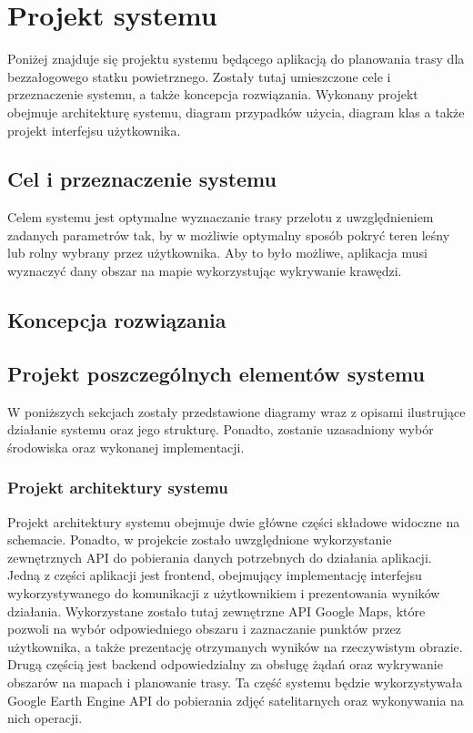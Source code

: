 \chapter{Projekt systemu}
\label{chap:system project}

Poniżej znajduje się projektu systemu będącego aplikacją do planowania trasy dla bezzałogowego statku powietrznego. Zostały tutaj umieszczone cele i przeznaczenie systemu, a także koncepcja rozwiązania. Wykonany projekt obejmuje architekturę systemu, diagram przypadków użycia, diagram klas a także projekt interfejsu użytkownika. 

\section{Cel i przeznaczenie systemu}

Celem systemu jest optymalne wyznaczanie trasy przelotu z uwzględnieniem zadanych parametrów tak, by w możliwie optymalny sposób pokryć teren leśny lub rolny wybrany przez użytkownika. Aby to było możliwe, aplikacja musi wyznaczyć dany obszar na mapie wykorzystując wykrywanie krawędzi.

\section{Koncepcja rozwiązania}



\section{Projekt poszczególnych elementów systemu}

W poniższych sekcjach zostały przedstawione diagramy wraz z opisami ilustrujące działanie systemu oraz jego strukturę. Ponadto, zostanie uzasadniony wybór środowiska oraz wykonanej implementacji.

\subsection{Projekt architektury systemu}

Projekt architektury systemu obejmuje dwie główne części składowe widoczne na schemacie. Ponadto, w projekcie zostało uwzględnione wykorzystanie zewnętrznych API do pobierania danych potrzebnych do działania aplikacji. Jedną z części aplikacji jest frontend, obejmujący implementację interfejsu wykorzystywanego do komunikacji z użytkownikiem i prezentowania wyników działania. Wykorzystane zostało tutaj zewnętrzne API Google Maps, które pozwoli na wybór odpowiedniego obszaru i zaznaczanie punktów przez użytkownika, a także prezentację otrzymanych wyników na rzeczywistym obrazie. Drugą częścią jest backend odpowiedzialny za obsługę żądań oraz wykrywanie obszarów na mapach i planowanie trasy. Ta część systemu będzie wykorzystywała Google Earth Engine API do pobierania zdjęć satelitarnych oraz wykonywania na nich operacji.


